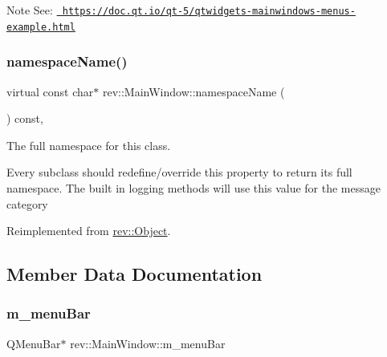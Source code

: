 \begin{DoxyNote}{Note}
See\+: \href{https://doc.qt.io/qt-5/qtwidgets-mainwindows-menus-example.html}{\texttt{ https\+://doc.\+qt.\+io/qt-\/5/qtwidgets-\/mainwindows-\/menus-\/example.\+html}} 
\end{DoxyNote}
\mbox{\label{classrev_1_1_main_window_a3d38cd81c10da2fcb09922c9d4dfd990}} 
\subsubsection{\texorpdfstring{namespaceName()}{namespaceName()}}
{\footnotesize\ttfamily virtual const char$\ast$ rev\+::\+Main\+Window\+::namespace\+Name (\begin{DoxyParamCaption}{ }\end{DoxyParamCaption}) const\hspace{0.3cm}{\ttfamily [inline]}, {\ttfamily [virtual]}}



The full namespace for this class. 

Every subclass should redefine/override this property to return its full namespace. The built in logging methods will use this value for the message category 

Reimplemented from \mbox{\hyperlink{classrev_1_1_object_aaeb638d3e10f361c56c211a318a27f3d}{rev\+::\+Object}}.



\subsection{Member Data Documentation}
\mbox{\label{classrev_1_1_main_window_a453701f94612424e40e1f77d7a223a32}} 
\subsubsection{\texorpdfstring{m\_menuBar}{m\_menuBar}}
{\footnotesize\ttfamily Q\+Menu\+Bar$\ast$ rev\+::\+Main\+Window\+::m\+\_\+menu\+Bar\hspace{0.3cm}{\ttfamily [protected]}}



